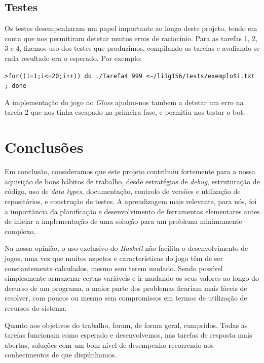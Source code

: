 \documentclass[a4paper]{article}
\begin{document}
\pagebreak

\subsection{Testes}

\hspace{0.54cm}Os testes desempenharam um papel importante ao longo deste projeto, tendo em conta que nos permitiram detetar
    muitos erros de raciocínio. Para as tarefas 1, 2, 3 e 4, fizemos uso dos testes que produzimos, compilando as tarefas
    e avaliando se cada resultado era o esperado. Por exemplo:
    \linebreak
    
    \texttt{>for((i=1;i<=20;i++)) do ./Tarefa4 999 <\textasciitilde/li1g156/tests/exemplo\$i.txt ; done}
    \linebreak
    
    A implementação do jogo no \emph{Gloss} ajudou-nos tambem a detetar um erro na tarefa 2 que nos tinha escapado
    na primeira fase, e permitiu-nos testar o bot. \hspace{4.5cm}
    \linebreak
    
\pagebreak












\section{Conclusões}

\hspace{0.54cm}Em conclusão, consideramos que este projeto contribuiu fortemente para a nossa aquisição de bons hábitos de trabalho, desde
    estratégias de \textit{debug}, estruturação de código, uso de \textit{data types}, documentação, controlo de versões
    e utilização de repositórios, e construção de testes. A aprendizagem mais relevante, para nós, foi a importância
    da planificação e desenvolvimento de ferramentas elementares antes de iniciar a implementação de uma solução para
    um problema minimamente complexo.
    
	
	    Na nossa opinião, o uso exclusivo do \emph{Haskell} não facilita o desenvolvimento de jogos, 
    uma vez que muitos aspetos e características do jogo têm de ser constantemente calculados,
    mesmo sem terem mudado. Sendo possível simplesmente armazenar certas variáveis e ir mudando
    os seus valores ao longo do decurso de um programa, a maior parte dos problemas ficariam
    mais fáceis de resolver, com poucos ou mesmo sem compromissos em termos de utilização de
    recursos do sistema.
    
    
    Quanto aos objetivos do trabalho, foram, de forma geral, cumpridos. Todas as tarefas funcionam como esperado e 
    desenvolvemos, nas tarefas de resposta mais abertas, soluções com um bom nível de desempenho recorrendo aos conhecimentos
    de que dispúnhamos.
\end{document}
